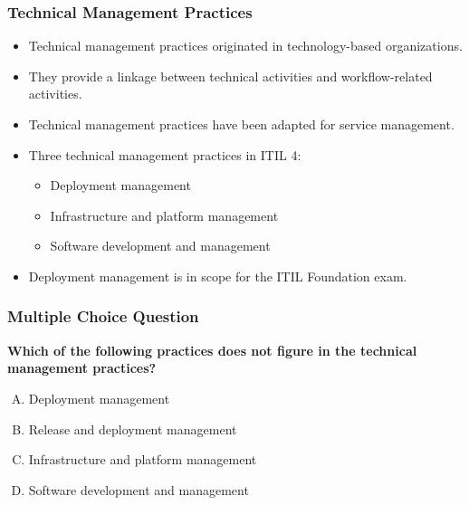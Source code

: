 \documentclass[aspectratio=169, table]{beamer}
\begin{document}
\begin{frame}
	\frametitle{Technical Management Practices}
	
	\begin{itemize}
		\item Technical management practices originated in technology-based organizations.
		\item They provide a linkage between technical activities and workflow-related activities.
		\item Technical management practices have been adapted for service management.
		\item Three technical management practices in ITIL 4:
		\begin{itemize}
			\item Deployment management
			\item Infrastructure and platform management
			\item Software development and management
		\end{itemize}
		\item Deployment management is in scope for the ITIL Foundation exam.
	\end{itemize}
	
\end{frame}

\begin{frame}
	\frametitle{Multiple Choice Question}
	
	\textbf{Which of the following practices does not figure in the technical management practices?}
	
	\begin{enumerate}[A.]
		\item Deployment management
		\item Release and deployment management
		\item Infrastructure and platform management
		\item Software development and management
	\end{enumerate}
	
\end{frame}
\end{document}
